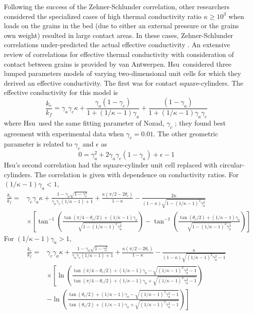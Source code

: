 Following the success of the Zehner-Schlunder correlation, other researchers considered the specialized cases of high thermal conductivity ratio $\kappa \ge 10^3$ when loads on the grains in the bed (due to either an external pressure or the grains own weight) resulted in large contact areas. In these cases, Zehner-Schlunder correlations under-predicted the actual effective conductivity \cite{Aichlmayr2005a}. An extensive review of correlations for effective thermal conductivity with consideration of contact between grains is provided by van Antwerpen\etal \cite{VanAntwerpen2010}. Hsu\etal~considered three lumped parameters models of varying two-dimensional unit cells for which they derived an effective conductivity. The first was for contact square-cylinders. The effective conductivity for this model is
\begin{equation}
    \frac{k_e}{k_f} = \gamma_a\gamma_c\kappa + \frac{\gamma_a(1-\gamma_c)}{1+(1/\kappa-1)\gamma_a} + \frac{(1-\gamma_a)}{1+(1/\kappa-1)\gamma_a\gamma_c}
\end{equation}
where Hsu\etal~used the same fitting parameter of Nozad\etal, $\gamma_c$ \cite{nozad}; they found best agreement with experimental data when $\gamma_c = 0.01$. The other geometric parameter is related to $\gamma_c$ and $\epsilon$ as
\begin{equation}
    0=\gamma_a^2 + 2\gamma_a\gamma_c(1-\gamma_a) + \epsilon - 1
\end{equation}
Hsu\etal's second correlation had the square-cylinder unit cell replaced with circular-cylinders. The correlation is given with dependence on conductivity ratios. For $(1/\kappa-1)\gamma_a < 1$,
\begin{equation}
\begin{split}
    \frac{k_e}{k_f} ={} &\gamma_c\gamma_a\kappa + \frac{1-\gamma_a\sqrt{1-\gamma_c^2}}{\gamma_a\gamma_c(1/\kappa-1)+1} + \frac{\kappa(\pi/2 - 2\theta_c)}{1-\kappa} - \frac{2\kappa}{(1-\kappa)\sqrt{1-(1/\kappa-1)^2\gamma_a^2}}\\
    &\times\left[\tan^{-1}\left(\frac{\tan(\pi/4 - \theta_c/2)+(1/\kappa-1)\gamma_a}{\sqrt{1-(1/\kappa-1)^2\gamma_a^2}} \right) - \tan^{-1}\left(\frac{\tan(\theta_c/2)+(1/\kappa-1)\gamma_a}{\sqrt{1-(1/\kappa-1)^2\gamma_a^2}}\right) \right]
\end{split}
\end{equation}
For $(1/\kappa-1)\gamma_a>1$,
\begin{equation}
\begin{split}
    \frac{k_e}{k_f} ={} &\gamma_c\gamma_a\kappa + \frac{1-\gamma_a\sqrt{1-\gamma_c^2}}{\gamma_a\gamma_c(1/\kappa-1)+1} + \frac{\kappa(\pi/2 - 2\theta_c)}{1-\kappa} - \frac{\kappa}{(1-\kappa)\sqrt{(1/\kappa-1)^2\gamma_a^2-1}}\\
    & \times\left[\ln\left(\frac{\tan(\pi/4 - \theta_c/2)+(1/\kappa-1)\gamma_a - \sqrt{(1/\kappa-1)^2\gamma_a^2-1}}{\tan(\pi/4-\theta_c/2) +(1/\kappa-1)\gamma_a+\sqrt{(1/\kappa-1)^2\gamma_a^2-1}} \right) \right.\\
    & -\left.\ln\left(\frac{\tan(\theta_c/2)+(1/\kappa-1)\gamma_a - \sqrt{(1/\kappa-1)^2\gamma_a^2-1}}{\tan(\theta_c/2) +(1/\kappa-1)\gamma_a+\sqrt{(1/\kappa-1)^2\gamma_a^2-1}} \right) \right]
\end{split}
\end{equation}
